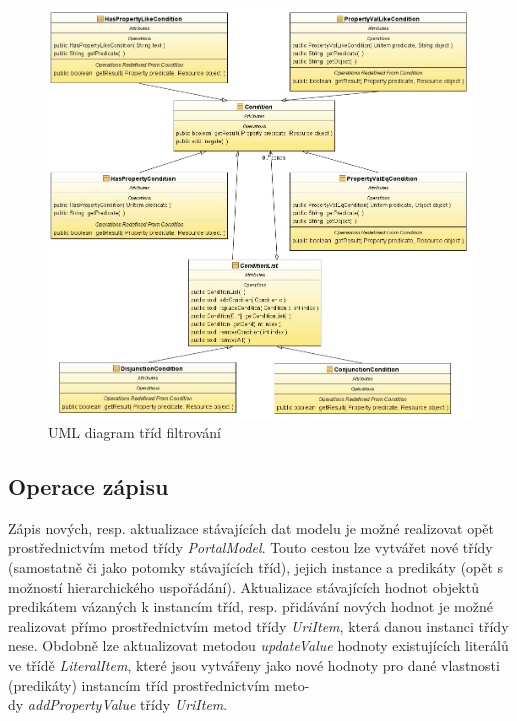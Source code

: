 \documentclass{projekt}
\begin{document}
\begin{figure}[htb]
\begin{center}
\includegraphics[scale=0.5]{filter.jpg}
\caption{UML diagram tříd filtrování}
\end{center}
\end{figure}


\subsection{Operace zápisu}
\hspace{0.65cm}Zápis nových, resp. aktualizace stávajících dat modelu je možné realizovat opět prostřednictvím metod třídy {\it PortalModel}. Touto cestou lze vytvářet nové třídy (samostatně či jako potomky stávajících tříd), jejich instance a predikáty (opět s možností hierarchického uspořádání). Aktualizace stávajících hodnot objektů predikátem vázaných k instancím tříd, resp. přidávání nových hodnot je možné realizovat přímo prostřednictvím metod třídy {\it UriItem}, která danou instanci třídy nese. Obdobně lze aktualizovat metodou {\it updateValue} hodnoty existujících literálů ve třídě {\it LiteralItem},  které jsou vytvářeny jako nové hodnoty pro dané vlastnosti (predikáty) instancím tříd prostřednictvím meto-\\dy {\it addPropertyValue} třídy {\it UriItem}.
\end{document}
